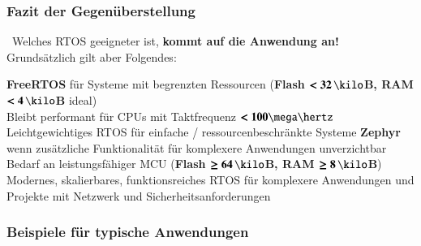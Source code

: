 \subsubsection{Fazit der Gegenüberstellung}

\textrightarrow\ Welches RTOS geeigneter ist, \textbf{kommt auf die Anwendung an!} \\
Grundsätzlich gilt aber Folgendes:

\vspace{0.1cm}

\begin{outline}
    \1 \textbf{FreeRTOS} für Systeme mit begrenzten Ressourcen (\textbf{Flash $\bm{< 32 \, \kilo}$B, RAM $\bm{< 4 \, \kilo}$B} ideal) \\
        Bleibt performant für CPUs mit Taktfrequenz $\bm{< 100 \mega \hertz}$
        \2 Leichtgewichtiges RTOS für einfache / ressourcenbeschränkte Systeme
    \1  \textbf{Zephyr} wenn zusätzliche Funktionalität für komplexere Anwendungen unverzichtbar \\
        Bedarf an leistungsfähiger MCU (\textbf{Flash $\bm{\geq 64 \, \kilo}$B, RAM $\bm{\geq 8 \, \kilo}$B})
        \2 Modernes, skalierbares, funktionsreiches RTOS für komplexere Anwendungen und Projekte mit Netzwerk und Sicherheitsanforderungen
\end{outline}


\subsubsection{Beispiele für typische Anwendungen}



